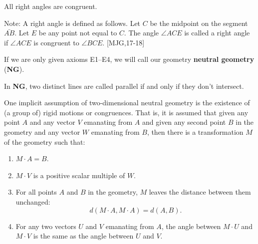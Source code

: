 \documentclass{ximera}
\begin{document}
\begin{axiom}[E4]
All right angles are congruent. 

Note: A right angle is defined as follows. Let $C$ be the midpoint on
the segment $\bar{AB}$. Let $E$ be any point not equal to
$C$. The angle $\angle ACE$ is called a right angle if $\angle ACE$ is
congruent to $\angle BCE$. [MJG,17-18]
\end{axiom}

\begin{definition}
If we are only given axioms E1--E4, we will call our
geometry \textbf{neutral geometry} (\textbf{NG}).
\end{definition}

\begin{definition}
In \textbf{NG}, two distinct lines are called parallel if and only if they
don't intersect.
\end{definition}

One implicit assumption of two-dimensional neutral geometry is the
existence of (a group of) rigid motions or congruences. That is, it is
assumed that given any point $A$ and any vector
$V$ emanating from $A$ and given any second point
$B$ in the geometry and any vector $W$ emanating
from $B$, then there is a transformation $M$ of the
geometry such that:
\begin{enumerate}
\item $M\cdot A=B$.
\item $M\cdot V$ is a positive scalar multiple of $W$.
\item For all points $A$ and $B$ in the geometry,
  $M$ leaves the distance between them unchanged:
\[
d\left(M\cdot A,  M\cdot A\right) =d\left( A,B\right).
\]
\item For any two vectors $U$ and $V$ emanating from
  $A$, the angle between $M\cdot U$ and
  $M\cdot V$ is the same as the angle between $U$
  and $V$.
\end{enumerate}


\end{document}
